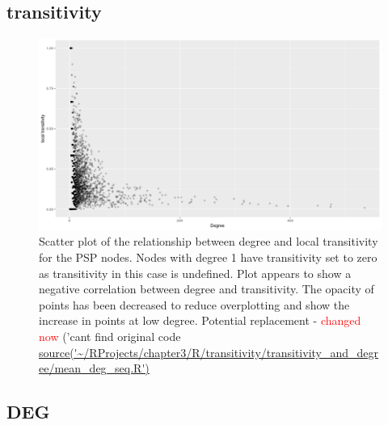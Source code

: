 \subsection{transitivity}
\begin{figure}
    \centering
    \includegraphics[width=\textwidth]{images/Rplot02_degree_and_transitivity-change_alpha.png}
    \caption{Scatter plot of the relationship between degree and local transitivity for the PSP nodes. Nodes with degree 1 have transitivity set to zero as transitivity in this case is undefined. Plot appears to show a negative correlation between degree and transitivity. The opacity of points has been decreased to reduce overplotting and show the increase in points at low degree. Potential replacement - \textcolor{red}{changed now} ('cant find original code \url{source('~/RProjects/chapter3/R/transitivity/transitivity_and_degree/mean_deg_seq.R')}}
    \label{fig:Scatter plot of the relationship between degree and local transitivity for the PSP nodes1}
\end{figure}

\subsection{DEG}
